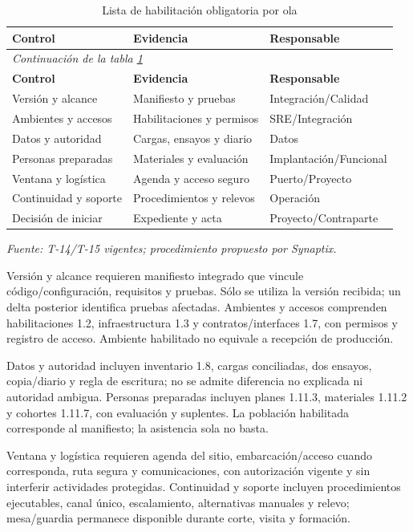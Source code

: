 \begingroup\small\setlength{\tabcolsep}{3pt}
\begin{longtable}{p{}p{}p{}}
\caption{Lista de habilitación obligatoria por ola}\label{tab:t18-habilitacion}\\\hline
\textbf{Control} & \textbf{Evidencia} & \textbf{Responsable}\\\hline\endfirsthead
\multicolumn{3}{l}{\textit{Continuación de la tabla \ref{tab:t18-habilitacion}}}\\\hline
\textbf{Control} & \textbf{Evidencia} & \textbf{Responsable}\\\hline\endhead
\hline\endfoot\hline\endlastfoot
Versión y alcance & Manifiesto y pruebas & Integración/Calidad\\\hline
Ambientes y accesos & Habilitaciones y permisos & SRE/Integración\\\hline
Datos y autoridad & Cargas, ensayos y diario & Datos\\\hline
Personas preparadas & Materiales y evaluación & Implantación/Funcional\\\hline
Ventana y logística & Agenda y acceso seguro & Puerto/Proyecto\\\hline
Continuidad y soporte & Procedimientos y relevos & Operación\\\hline
Decisión de iniciar & Expediente y acta & Proyecto/Contraparte\\\hline
\end{longtable}\endgroup
\noindent\textit{Fuente: T-14/T-15 vigentes; procedimiento propuesto por Synaptix.}

Versión y alcance requieren manifiesto integrado que vincule código/configuración, requisitos y pruebas. Sólo se utiliza la versión recibida; un delta posterior identifica pruebas afectadas. Ambientes y accesos comprenden habilitaciones 1.2, infraestructura 1.3 y contratos/interfaces 1.7, con permisos y registro de acceso. Ambiente habilitado no equivale a recepción de producción.

Datos y autoridad incluyen inventario 1.8, cargas conciliadas, dos ensayos, copia/diario y regla de escritura; no se admite diferencia no explicada ni autoridad ambigua. Personas preparadas incluyen planes 1.11.3, materiales 1.11.2 y cohortes 1.11.7, con evaluación y suplentes. La población habilitada corresponde al manifiesto; la asistencia sola no basta.

Ventana y logística requieren agenda del sitio, embarcación/acceso cuando corresponda, ruta segura y comunicaciones, con autorización vigente y sin interferir actividades protegidas. Continuidad y soporte incluyen procedimientos ejecutables, canal único, escalamiento, alternativas manuales y relevo; mesa/guardia permanece disponible durante corte, visita y formación.

